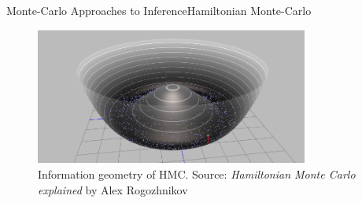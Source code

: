 \documentclass[AERbeamer%
              ,optEnglish%
              ,optBiber%
              ,optBibstyleAlphabetic%
              ,optBeamerClassicFormat%
              ]{AERlatex}%
\begin{document}
\begin{frame}[c]{Monte-Carlo Approaches to Inference}{Hamiltonian Monte-Carlo}
    \centering
    \begin{figure}
        \centering
        \includegraphics[width=0.8\textwidth]{HMCGeometry.png}
        \caption{Information geometry of HMC. Source: \textit{Hamiltonian Monte Carlo explained} by Alex Rogozhnikov}
    \end{figure}
\end{frame}
\end{document}
